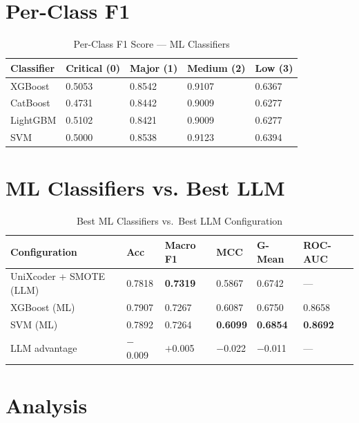 \documentclass[12pt, a4paper]{report}
\begin{document}
\section{Per-Class F1}

\begin{table}[H]
\centering
\caption{Per-Class F1 Score --- ML Classifiers}
\label{tab:ml_perclass}
\begin{tabular}{L{2.5cm} C{2.5cm} C{2.5cm} C{2.5cm} C{2.5cm}}
\toprule
\textbf{Classifier} & \textbf{Critical (0)} & \textbf{Major (1)} & \textbf{Medium (2)} & \textbf{Low (3)} \\
\midrule
XGBoost  & 0.5053 & 0.8542 & 0.9107 & 0.6367 \\
CatBoost & 0.4731 & 0.8442 & 0.9009 & 0.6277 \\
LightGBM & 0.5102 & 0.8421 & 0.9009 & 0.6277 \\
SVM      & 0.5000 & 0.8538 & 0.9123 & 0.6394 \\
\bottomrule
\end{tabular}
\end{table}

\section{ML Classifiers vs. Best LLM}

\begin{table}[H]
\centering
\caption{Best ML Classifiers vs.\ Best LLM Configuration}
\label{tab:ml_vs_llm}
\begin{tabular}{L{4.5cm} C{1.8cm} C{1.8cm} C{1.8cm} C{1.8cm} C{2cm}}
\toprule
\textbf{Configuration} & \textbf{Acc} & \textbf{Macro F1} & \textbf{MCC} & \textbf{G-Mean} & \textbf{ROC-AUC} \\
\midrule
UniXcoder + SMOTE (LLM) & 0.7818 & \textbf{0.7319} & 0.5867 & 0.6742 & --- \\
XGBoost (ML)            & 0.7907 & 0.7267 & 0.6087 & 0.6750 & 0.8658 \\
SVM (ML)                & 0.7892 & 0.7264 & \textbf{0.6099} & \textbf{0.6854} & \textbf{0.8692} \\
\midrule
LLM advantage           & $-$0.009 & $+$0.005 & $-$0.022 & $-$0.011 & --- \\
\bottomrule
\end{tabular}
\end{table}

\section{Analysis}
\end{document}
